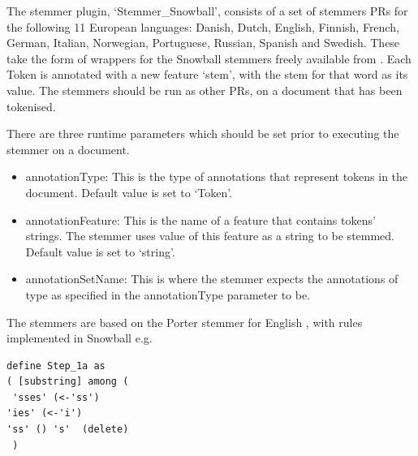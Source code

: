 
The stemmer plugin, `Stemmer\_Snowball', consists of a set of stemmers PRs for
the following 11 European languages: Danish, Dutch, English, Finnish, French,
German, Italian, Norwegian, Portuguese, Russian, Spanish and Swedish. These take
the form of wrappers for the Snowball stemmers freely available from
. Each Token is annotated with a new
feature `stem', with the stem for that word as its value. The stemmers should be
run as other PRs, on a document that has been tokenised.

There are three runtime parameters which should be set prior to executing 
the stemmer on a document.

\begin{itemize}
\item annotationType: This is the type of annotations that represent tokens
          in the document.  Default value is set to `Token'.

\item annotationFeature: This is the name of a feature that contains tokens'
          strings. The stemmer uses value of this feature as a string to be 
          stemmed.  Default value is set to `string'.

\item annotationSetName: This is where the stemmer expects the 
         annotations of type as specified in the annotationType parameter to be.

\end{itemize}


The stemmers are based on the Porter stemmer for English \cite{Porter80}, with
rules implemented in Snowball e.g.
\begin{small}
\begin{verbatim}
define Step_1a as
( [substring] among (
 'sses' (<-'ss')
'ies' (<-'i')
'ss' () 's'  (delete)
 )
 \end{verbatim}
\end{small}


